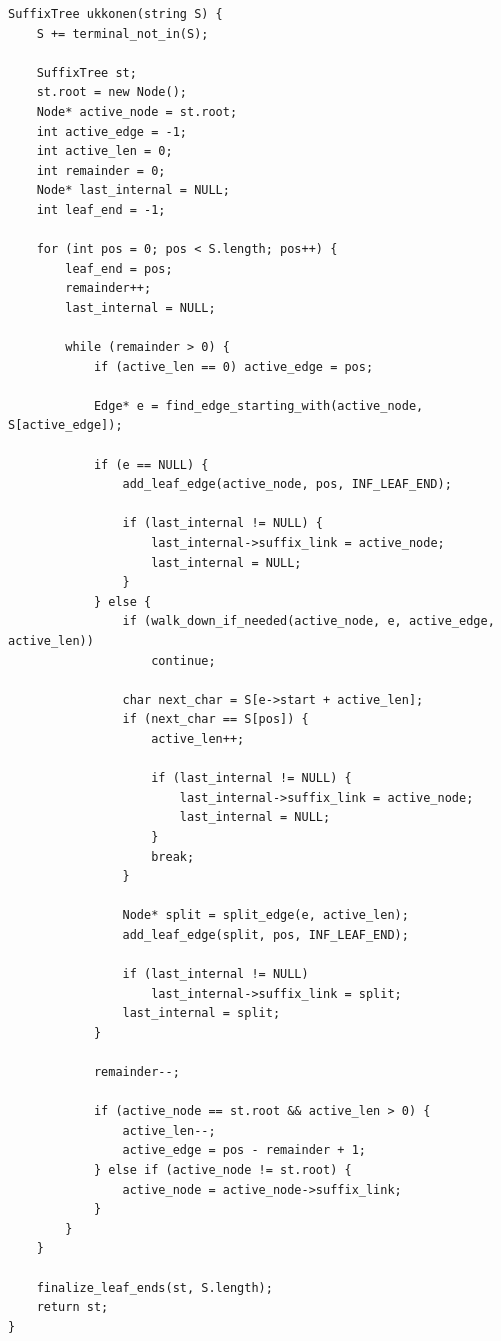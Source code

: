 \documentclass[11pt]{article}
\begin{document}
\begin{verbatim}
SuffixTree ukkonen(string S) {
    S += terminal_not_in(S);

    SuffixTree st;
    st.root = new Node();
    Node* active_node = st.root;
    int active_edge = -1;
    int active_len = 0;
    int remainder = 0;
    Node* last_internal = NULL;
    int leaf_end = -1;

    for (int pos = 0; pos < S.length; pos++) {
        leaf_end = pos;
        remainder++;
        last_internal = NULL;

        while (remainder > 0) {
            if (active_len == 0) active_edge = pos;

            Edge* e = find_edge_starting_with(active_node, S[active_edge]);

            if (e == NULL) {
                add_leaf_edge(active_node, pos, INF_LEAF_END);

                if (last_internal != NULL) {
                    last_internal->suffix_link = active_node;
                    last_internal = NULL;
                }
            } else {
                if (walk_down_if_needed(active_node, e, active_edge, active_len))
                    continue;

                char next_char = S[e->start + active_len];
                if (next_char == S[pos]) {
                    active_len++;

                    if (last_internal != NULL) {
                        last_internal->suffix_link = active_node;
                        last_internal = NULL;
                    }
                    break;
                }

                Node* split = split_edge(e, active_len);
                add_leaf_edge(split, pos, INF_LEAF_END);

                if (last_internal != NULL)
                    last_internal->suffix_link = split;
                last_internal = split;
            }

            remainder--;

            if (active_node == st.root && active_len > 0) {
                active_len--;
                active_edge = pos - remainder + 1;
            } else if (active_node != st.root) {
                active_node = active_node->suffix_link;
            }
        }
    }

    finalize_leaf_ends(st, S.length);
    return st;
}
\end{verbatim}
\end{document}
